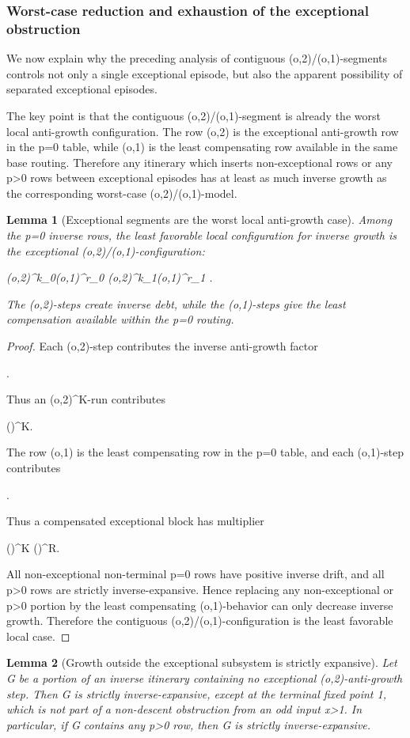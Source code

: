 \documentclass[11pt,letterpaper]{amsart}
\def\({}%
\def\){}%
\def\[{ }%
\def\]{ }%
\theoremstyle{definition}
\theoremstyle{plain}
\newtheorem{lemma}{Lemma}
\theoremstyle{plain}
\theoremstyle{remark}
\begin{document}
\subsubsection{Worst-case reduction and exhaustion of the exceptional obstruction}
\label{subsubsec:worst-case-reduction-exceptional-obstruction}

We now explain why the preceding analysis of contiguous
\((o,2)/(o,1)\)-segments controls not only a single exceptional episode,
but also the apparent possibility of separated exceptional episodes.

The key point is that the contiguous \((o,2)/(o,1)\)-segment is already
the worst local anti-growth configuration.  The row \((o,2)\) is the
exceptional anti-growth row in the \(p=0\) table, while \((o,1)\) is the
least compensating row available in the same base routing.  Therefore any
itinerary which inserts non-exceptional rows or any \(p>0\) rows between
exceptional episodes has at least as much inverse growth as the
corresponding worst-case \((o,2)/(o,1)\)-model.

\begin{lemma}[Exceptional segments are the worst local anti-growth case]
\label{lem:exceptional-segments-worst-case}
Among the \(p=0\) inverse rows, the least favorable local configuration
for inverse growth is the exceptional \((o,2)/(o,1)\)-configuration:
\[
(o,2)^{k_0}(o,1)^{r_0}
(o,2)^{k_1}(o,1)^{r_1}
\cdots .
\]
The \((o,2)\)-steps create inverse debt, while the \((o,1)\)-steps give
the least compensation available within the \(p=0\) routing.
\end{lemma}

\begin{proof}
Each \((o,2)\)-step contributes the inverse anti-growth factor
\[
.
\]
Thus an \((o,2)^K\)-run contributes
\[
\left(\right)^K.
\]
The row \((o,1)\) is the least compensating row in the \(p=0\) table, and
each \((o,1)\)-step contributes
\[
.
\]
Thus a compensated exceptional block has multiplier
\[
\left(\right)^K
\left(\right)^R.
\]
All non-exceptional non-terminal \(p=0\) rows have positive inverse drift,
and all \(p>0\) rows are strictly inverse-expansive. Hence replacing any
non-exceptional or \(p>0\) portion by the least compensating
\((o,1)\)-behavior can only decrease inverse growth.  Therefore the
contiguous \((o,2)/(o,1)\)-configuration is the least favorable local
case.
\end{proof}

\begin{lemma}[Growth outside the exceptional subsystem is strictly expansive]
\label{lem:growth-outside-exceptional-not-harmful}
Let \(G\) be a portion of an inverse itinerary containing no exceptional
\((o,2)\)-anti-growth step.  Then \(G\) is strictly inverse-expansive,
except at the terminal fixed point \(1\), which is not part of a
non-descent obstruction from an odd input \(x>1\).  In particular, if
\(G\) contains any \(p>0\) row, then \(G\) is strictly inverse-expansive.
\end{lemma}
\end{document}
